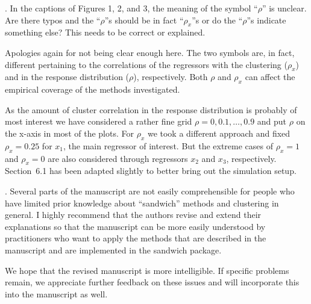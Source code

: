 \documentclass[american,foldmarks=false]{uibklttr}
\newenvironment{review}{\fontshape{\itdefault}\fontseries{\bfdefault} \selectfont \smallskip}{\par}
\begin{document}
\begin{review}
13. In the captions of Figures 1, 2, and 3, the meaning of the
symbol ``$\rho$'' is unclear. Are there typos and the ``$\rho$''s should be in
fact ``$\rho_x$''s or do the ``$\rho$''s indicate something else? This needs to
be correct or explained.
\end{review}

Apologies again for not being clear enough here. The two symbols are, in fact,
different pertaining to the correlations of the regressors with the clustering
($\rho_x$) and in the response distribution ($\rho$), respectively. Both $\rho$ and
$\rho_x$ can affect the empirical coverage of the methods investigated.

As the amount of cluster correlation in the response distribution is probably of most
interest we have considered a rather fine grid $\rho = 0, 0.1, \dots, 0.9$ and
put $\rho$ on the x-axis in most of the plots. For $\rho_x$ we took a different
approach and fixed $\rho_x = 0.25$ for $x_1$, the main regressor of interest.
But the extreme cases of $\rho_x = 1$ and $\rho_x = 0$ are also considered through
regressors $x_2$ and $x_3$, respectively. Section~6.1 has been adapted slightly
to better bring out the simulation setup.


\begin{review}
14. Several parts of the manuscript are not easily
comprehensible for people who have limited prior knowledge about ``sandwich''
methods and clustering in general. I highly recommend that the authors revise
and extend their explanations so that the manuscript can be more easily
understood by practitioners who want to apply the methods that are described in
the manuscript and are implemented in the sandwich package.
\end{review}

We hope that the revised manuscript is more intelligible. If specific problems
remain, we appreciate further feedback on these issues and will incorporate
this into the manuscript as well.
\end{document}
